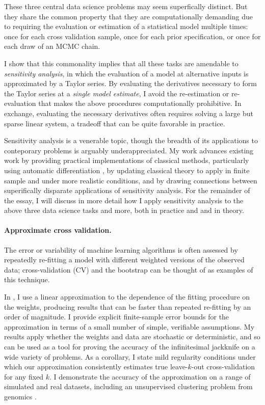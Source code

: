 These three central data science problems may seem superfically distinct.  But
they share the common property that they are computationally demanding due to
requiring the evaluation or estimation of a statistical model multiple times:
once for each cross validation sample, once for each prior specification, or
once for each draw of an MCMC chain.

I show that this commonality implies that all these tasks are amendable to {\em
sensitivity analysis}, in which the evaluation of a model at alternative inputs
is approximated by a Taylor series.  By evaluating the derivatives necessary to
form the Taylor series at a {\em single model estimate}, I avoid the
re-estimation or re-evaluation that makes the above procedures computationally
prohibitive.  In exchange, evaluating the necessary derivatives often requires
solving a large but sparse linear system, a tradeoff that can be quite favorable
in practice.

Sensitivity analysis is a venerable topic, though the breadth of its
applications to conteporary problems is arguably underappreciated.  My work
advances existing work by providing practical implementations of classical
methods, particularly using automatic differentiation
\citep{baydin:2015:automatic}, by updating classical theory to apply in finite
sample and under more realistic conditions, and by drawing connections between
superifically disparate applications of sensitivity analysis. For the remainder
of the essay, I will discuss in more detail how I apply sensitivity analysis to
the above three data science tasks and more, both in practice and and in theory.




\newpage

\paragraph{Approximate cross validation.}

The error or variability of machine learning algorithms is often assessed by
repeatedly re-fitting a model with different weighted versions of the observed
data; cross-validation (CV) and the bootstrap can be thought of as examples of
this technique.

In \citet{giordano:2019:ij}, I use a linear approximation to the
dependence of the fitting procedure on the weights, producing results that can
be faster than repeated re-fitting by an order of magnitude. I provide explicit
finite-sample error bounds for the approximation in terms of a small number of
simple, verifiable assumptions.  My results apply whether the weights and data
are stochastic or deterministic, and so can be used as a tool for proving the
accuracy of the infinitesimal jackknife on a wide variety of problems. As a
corollary, I state mild regularity conditions under which our approximation
consistently estimates true leave-$k$-out cross-validation for any fixed $k$. I
demonstrate the accuracy of the approximation on a range of simulated and real
datasets, including an unsupervised clustering problem from genomics
\citep{Luan:2003:clustering, shoemaker:2015:ultrasensitive}.


